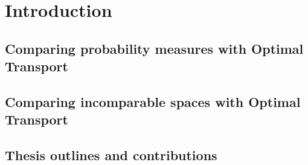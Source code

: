 \chapter[Introduction]{Introduction}

\localtableofcontents

\section{Comparing probability measures with Optimal Transport}

\section{Comparing incomparable spaces with Optimal Transport}

\section{Thesis outlines and contributions}
